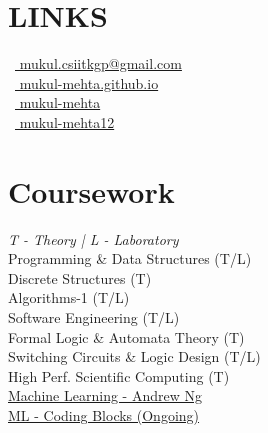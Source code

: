 \documentclass[]{deedy-resume-openfont}
\begin{document}
\begin{minipage}[t]{0.33\textwidth}

\section{LINKS} 
\faEnvelope\ {\href{mailto:mukul.csiitkgp@gmail.com}{ mukul.csiitkgp@gmail.com}}\\
\faGlobe\ {\href{https://mukul-mehta.github.io/}{ mukul-mehta.github.io}}\\
\faGithub\ {\href{https://github.com/mukul-mehta}{ mukul-mehta}}\\
\faLinkedinSquare\ {\href{https://www.linkedin.com/in/mukul-mehta12}{ mukul-mehta12}}\\

\sectionsep


\section{Coursework}
\emph{T - Theory | L - Laboratory}\\
Programming \& Data Structures (T/L)\\
Discrete Structures (T)\\
Algorithms-1 (T/L) \\
Software Engineering (T/L) \\
Formal Logic \& Automata Theory (T) \\
Switching Circuits \& Logic Design (T/L) \\
High Perf. Scientific Computing (T) \\ 
\href{https://www.coursera.org/learn/machine-learning}{Machine Learning - Andrew Ng}\\
\href{https://online.codingblocks.com/courses/40}{ML - Coding Blocks (Ongoing)}\\

\sectionsep
%
%

\end{minipage} 
\hfill
\end{document}
